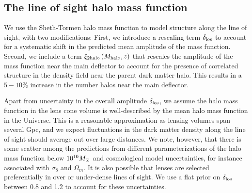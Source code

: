 \subsection{The line of sight halo mass function}
\label{ssec:losassumptions}
We use the Sheth-Tormen \citep{ST99} halo mass function to model structure along the line of sight, with two modifications: First, we introduce a rescaling term $\delta_{\rm{los}}$ to account for a systematic shift in the predicted mean amplitude of the mass function. Second, we include a term $\xi_{\rm{2halo}} \left(M_{\rm{halo}}, z\right)$ that rescales the amplitude of the mass function near the main deflector to account for the presence of correlated structure in the density field near the parent dark matter halo. This results in a $5 - 10 \%$ increase in the number halos near the main deflector. 

Apart from uncertainty in the overall amplitude $\delta_{\rm{los}}$, we assume the halo mass function in the lens cone volume is well-described by the mean halo mass function in the Universe. This is a reasonable approximation as lensing volumes span several Gpc, and we expect fluctuations in the dark matter density along the line of sight should average out over large distances. We note, however, that there is some scatter among the predictions from different parameterizations of the halo mass function below $10^{10}{M_{\odot}}$ \citep[e.g.][]{Despali++16} and cosmological model uncertainties, for instance associated with $\sigma_8$ and $\Omega_m$. It is also possible that lenses are selected preferentially in over or under-dense lines of sight. We use a flat prior on $\delta_{\rm{los}}$ between 0.8 and 1.2 to account for these uncertainties.

